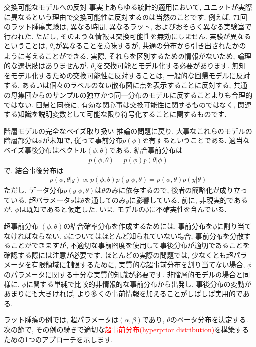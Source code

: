 \documentclass[10pt,dvipdfmx,a4]{beamer}
\newcommand{\eq}[1]{\begin{align}#1\end{align}}
\newcommand{\eqn}[1]{\begin{align*}#1\end{align*}}
\newcommand{\tcr}[1]{\textcolor{red}{#1}}
\begin{document}

\begin{frame}{交換可能なモデルへの反対}
事実上あらゆる統計的適用において, ユニットが実際に異なるという理由で交換可能性に反対するのは当然のことです.
例えば, 71回のラット腫瘍実験は, 異なる時間, 異なるラット, およびおそらく異なる実験室で行われた.
ただし, そのような情報は交換可能性を無効にしません.
実験が異なるということは, $\theta_j$が異なることを意味するが, 共通の分布から引き出されたかのように考えることができる.
実際, それらを区別するための情報がないため, 論理的な選択肢はありませんが, $\theta_j$を交換可能とモデル化する必要があります.
無知をモデル化するための交換可能性に反対することは, 一般的な回帰モデルに反対する, あるいは個々のラベルのない散布図に点を表示することに反対する, 共通の母集団からのサンプルの独立かつ同一分布のモデルに反することよりも合理的ではない.
回帰と同様に, 有効な関心事は交換可能性に関するものではなく, 関連する知識を説明変数として可能な限り符号化することに関するものです.
\end{frame}


\begin{frame}{階層モデルの完全なベイズ取り扱い}
推論の問題に戻り, 大事なこれらのモデルの階層部分は$\phi$が未知で, 従って事前分布$p(\phi)$を有するということである.
適当なベイズ事後分布はベクトル$(\phi,\theta)$である.
結合事前分布は
\eqn{p(\phi,\theta)=p(\phi)p(\theta|\phi)}
で, 結合事後分布は
\eq{p(\phi,\theta|y)\propto p(\phi,\theta)p(y|\phi,\theta)=p(\phi,\theta)p(y|\theta)}
ただし, データ分布$p(y|\phi,\theta)$は$\theta$のみに依存するので, 後者の簡略化が成り立っている.
超パラメータ$\phi$は$\theta$を通してのみ$y$に影響している.
前に, 非現実的であるが, $\phi$は既知であると仮定した.
いま, モデルの$\phi$に不確実性を含んでいる.
\end{frame}


\begin{frame}{超事前分布}
$(\phi, \theta)$の結合確率分布を作成するためには, 事前分布を$\phi$に割り当てなければならない.
$\phi$についてはほとんど知られていない場合, 事前分布を分散することができますが, 不適切な事前密度を使用して事後分布が適切であることを確認する際には注意が必要です.
ほとんどの実際の問題では, 少なくとも超パラメータを有限領域に制限するために, 実質的な超事前分布を割り当てない場合, $\phi$のパラメータに関する十分な実質的知識が必要です.
非階層的モデルの場合と同様に, $\phi$に関する単純で比較的非情報的な事前分布から出発し, 事後分布の変動があまりにも大きければ, より多くの事前情報を加えることがしばしば実用的である.

ラット腫瘍の例では, 超パラメータは$(\alpha,\beta)$であり, $\theta$のベータ分布を決定する.
次の節で, その例の続きで適切な\tcr{超事前分布(hyperprior distribution)}を構築するための1つのアプローチを示します.
\end{frame}
\end{document}
